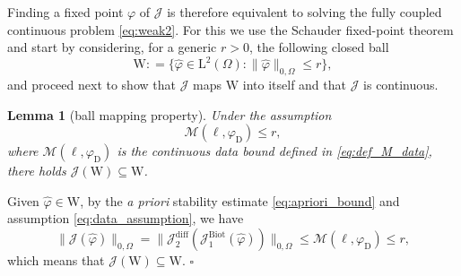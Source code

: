 \documentclass[fleqn,a4paper]{cas-sc}
\newcommand{\0}{\boldsymbol{0}}
\newcommand\cJ{\mathcal{J}}
\newcommand\rL{\mathrm{L}}
\newcommand\rW{\mathrm{W}}
\numberwithin{equation}{section}
\numberwithin{figure}{section}
\newtheorem{lemma}[theorem]{Lemma}
\newenvironment{proof}{\noindent{\it Proof.}}{\hfill$\square$}
\begin{document}
Finding a fixed point $\varphi$ of $\cJ$ is therefore equivalent to solving the fully coupled continuous problem \eqref{eq:weak2}. For this we use the  Schauder fixed-point theorem and start by considering, for a generic $r>0$, the following closed ball
\[ 
\rW : = \{ \widehat{\varphi} \in \rL^{2}(\Omega): \|\widehat{\varphi}\|_{0,\Omega}  \leq r \},
\]
and proceed next to show that {$\cJ$ maps $\rW$ into itself and that $\mathcal{J}$ is continuous}.
\begin{lemma}[ball mapping property]\label{lemma:ball_mapping}
    Under the assumption
    \begin{equation}\label{eq:data_assumption}
        \mathcal{M}(\ell, \varphi_{\mathrm{D}}) \le r,
    \end{equation}
    where $\mathcal{M}(\ell, \varphi_{\mathrm{D}})$ is the continuous data bound defined in \eqref{eq:def_M_data}, there holds $\mathcal{J}(\mathrm{W}) \subseteq \mathrm{W}$.
\end{lemma}
\begin{proof}
    Given $\widehat{\varphi} \in \mathrm{W}$, by the \emph{a priori} stability estimate \eqref{eq:apriori_bound} and assumption \eqref{eq:data_assumption}, we have
    \begin{equation*}
        \|\mathcal{J}(\widehat{\varphi})\|_{0,\Omega} = \| \cJ^{\mathrm{diff}}_2\left(\cJ^{\mathrm{Biot}}_1(\widehat{\varphi})\right)\|_{0,\Omega} \le \mathcal{M}(\ell, \varphi_{\mathrm{D}}) \le r,
    \end{equation*}
    which means that $\mathcal{J}(\mathrm{W}) \subseteq \mathrm{W}$.
\end{proof}
\end{document}

